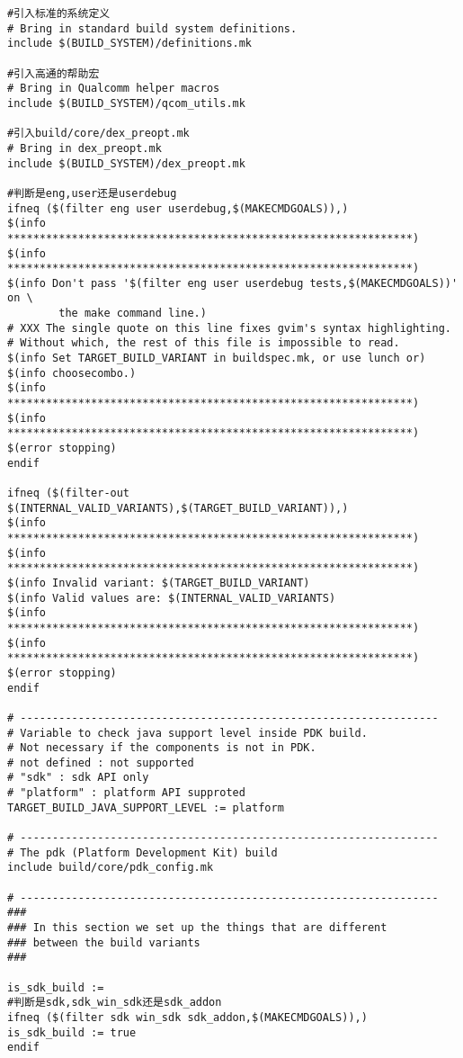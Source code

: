 \documentclass[12pt,a4paper]{article}
\begin{document}
\begin{verbatim}
#引入标准的系统定义
# Bring in standard build system definitions.
include $(BUILD_SYSTEM)/definitions.mk

#引入高通的帮助宏
# Bring in Qualcomm helper macros
include $(BUILD_SYSTEM)/qcom_utils.mk

#引入build/core/dex_preopt.mk
# Bring in dex_preopt.mk
include $(BUILD_SYSTEM)/dex_preopt.mk

#判断是eng,user还是userdebug
ifneq ($(filter eng user userdebug,$(MAKECMDGOALS)),)
$(info ***************************************************************)
$(info ***************************************************************)
$(info Don't pass '$(filter eng user userdebug tests,$(MAKECMDGOALS))' on \
		the make command line.)
# XXX The single quote on this line fixes gvim's syntax highlighting.
# Without which, the rest of this file is impossible to read.
$(info Set TARGET_BUILD_VARIANT in buildspec.mk, or use lunch or)
$(info choosecombo.)
$(info ***************************************************************)
$(info ***************************************************************)
$(error stopping)
endif

ifneq ($(filter-out $(INTERNAL_VALID_VARIANTS),$(TARGET_BUILD_VARIANT)),)
$(info ***************************************************************)
$(info ***************************************************************)
$(info Invalid variant: $(TARGET_BUILD_VARIANT)
$(info Valid values are: $(INTERNAL_VALID_VARIANTS)
$(info ***************************************************************)
$(info ***************************************************************)
$(error stopping)
endif

# -----------------------------------------------------------------
# Variable to check java support level inside PDK build.
# Not necessary if the components is not in PDK.
# not defined : not supported
# "sdk" : sdk API only
# "platform" : platform API supproted
TARGET_BUILD_JAVA_SUPPORT_LEVEL := platform

# -----------------------------------------------------------------
# The pdk (Platform Development Kit) build
include build/core/pdk_config.mk

# -----------------------------------------------------------------
###
### In this section we set up the things that are different
### between the build variants
###

is_sdk_build :=
#判断是sdk,sdk_win_sdk还是sdk_addon
ifneq ($(filter sdk win_sdk sdk_addon,$(MAKECMDGOALS)),)
is_sdk_build := true
endif



\end{verbatim}
\end{document}

